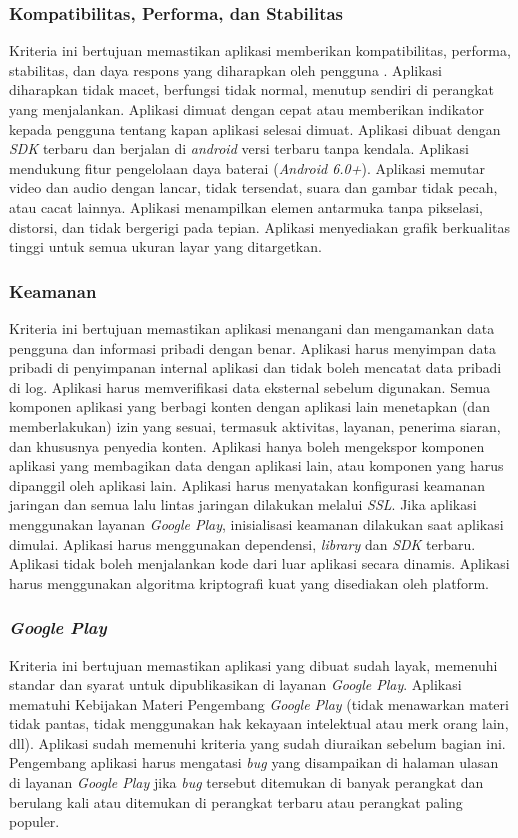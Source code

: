 \subsubsection{Kompatibilitas, Performa, dan Stabilitas}
Kriteria ini bertujuan memastikan aplikasi memberikan kompatibilitas, performa, stabilitas, dan daya respons yang diharapkan oleh pengguna \cite{androiddev}. Aplikasi diharapkan tidak macet, berfungsi tidak normal, menutup sendiri di perangkat yang menjalankan. Aplikasi dimuat dengan cepat atau memberikan indikator kepada pengguna tentang kapan aplikasi selesai dimuat. Aplikasi dibuat dengan \textit{SDK} terbaru dan berjalan di \textit{android} versi terbaru tanpa kendala. Aplikasi mendukung fitur pengelolaan daya baterai (\textit{Android 6.0+}). Aplikasi memutar video dan audio dengan lancar, tidak tersendat, suara dan gambar tidak pecah, atau cacat lainnya. Aplikasi menampilkan elemen antarmuka tanpa pikselasi, distorsi, dan tidak bergerigi pada tepian. Aplikasi menyediakan grafik berkualitas tinggi untuk semua ukuran layar yang ditargetkan. 

\subsubsection{Keamanan}
Kriteria ini bertujuan memastikan aplikasi menangani dan mengamankan data pengguna dan informasi pribadi dengan benar\cite{androiddev}. Aplikasi harus menyimpan data pribadi di penyimpanan internal aplikasi dan tidak boleh mencatat data pribadi di log. Aplikasi harus memverifikasi data eksternal sebelum digunakan. Semua komponen aplikasi yang berbagi konten dengan aplikasi lain menetapkan (dan memberlakukan) izin yang sesuai, termasuk aktivitas, layanan, penerima siaran, dan khususnya penyedia konten. Aplikasi hanya boleh mengekspor komponen aplikasi yang membagikan data dengan aplikasi lain, atau komponen yang harus dipanggil oleh aplikasi lain. Aplikasi harus menyatakan konfigurasi keamanan jaringan dan semua lalu lintas jaringan dilakukan melalui \textit{SSL}. Jika aplikasi menggunakan layanan \textit{Google Play}, inisialisasi keamanan dilakukan saat aplikasi dimulai. Aplikasi harus menggunakan dependensi, \textit{library} dan \textit{SDK} terbaru. Aplikasi tidak boleh menjalankan kode dari luar aplikasi secara dinamis. Aplikasi harus menggunakan algoritma kriptografi kuat yang disediakan oleh platform.

\subsubsection{\textit{Google Play}}
Kriteria ini bertujuan memastikan aplikasi yang dibuat sudah layak, memenuhi standar dan syarat untuk dipublikasikan di layanan \textit{Google Play}\cite{androiddev}. Aplikasi mematuhi Kebijakan Materi Pengembang \textit{Google Play} (tidak menawarkan materi tidak pantas, tidak menggunakan hak kekayaan intelektual atau merk orang lain, dll). Aplikasi sudah memenuhi kriteria yang sudah diuraikan sebelum bagian ini. Pengembang aplikasi harus mengatasi \textit{bug} yang disampaikan di halaman ulasan di layanan \textit{Google Play} jika \textit{bug} tersebut ditemukan di banyak perangkat dan berulang kali atau ditemukan di perangkat terbaru atau perangkat paling populer.    

